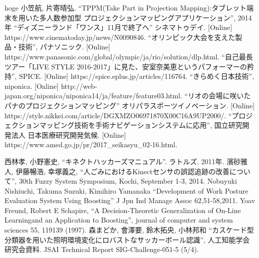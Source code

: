 \begin{thebibliography}{99}
\thispagestyle{fancy}
 hoge
 小笠航, 片寄晴弘. ``TPPM(Take Part in Projection Mapping):タブレット端末を用いた多人数参加型 プロジェクションマッピングアプリケーション'', 2014年
 ``ディズニーランド「ワンス」11月で終了へ'' シネマトゥデイ. [Online] https://www.cinematoday.jp/news/N0090846.
 ``オリンピック大会を支えた製品・技術'', パナソニック. [Online]  https://www.panasonic.com/global/olympic/ja/rio/solution/dlp.html.
 ``自己最長ツアー「LIVE STYLE 2016-2017」に見た、安室奈美恵というパフォーマーの矜持'', SPICE. [Online] https://spice.eplus.jp/articles/116764.
 ``きらめく日本技術'', niponica. [Online] http://web-japan.org/niponica/niponica14/ja/feature/feature03.html.
 ``リオの会場に咲いたパナのプロジェクションマッピング'' オリパラスポーツイノベーション. [Online] https://style.nikkei.com/article/DGXMZO06971870X00C16A9UP2000/.
 ``プロジェクションマッピング技術を手術ナビゲーションシステムに応用'', 国立研究開発法人 日本医療研究開発気候. [Online] https://www.amed.go.jp/pr/2017\_seikasyu\_02-16.html.


 西林孝, 小野憲史, ``キネクトハッカーズマニュアル''. ラトルズ. 2011年.
 濱砂雅人, 伊藤暢浩, 幸塚義之, ``人ごみにおけるKinectセンサの誤認追跡の改善について'', 30th Fuzzy System Symposium, Kochi, September 1-3, 2014.
 Nobuyuki Nishiuchi, Takuma Suzuki, Kimihiro Yamanaka ``Development of Work Posture Evaluation System Using Boosting'' J Jpn Ind Manage Assoc 62,51-58,2011.
 Yoav Freund, Robert E Schapire, ``A Decision-Theoretic Generalization of On-Line Learningand an Application to Boosting'', journal of computer and system sciences 55, 119139 (1997).
 森まどか, 會澤要, 鈴木拓央, 小林邦和 ``カスケード型分類器を用いた照明環境変化にロバストなサッカーボール認識'', 人工知能学会研究会資料. JSAI Technical Report SIG-Challenge-051-5 (5/4).


\end{thebibliography}    